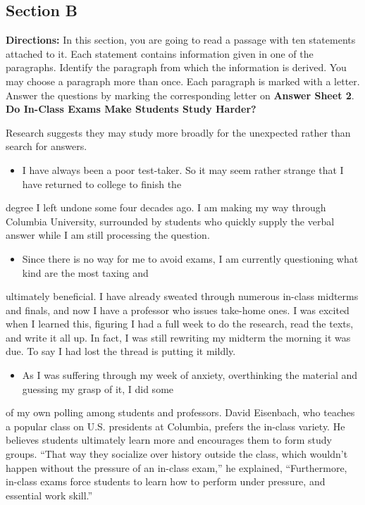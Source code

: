 \documentclass[UTF8,11pt]{ctexart}
\begin{document}
\subsection*{\textbf{Section B}}


\textbf{Directions:} In this section, you are going to read a passage with ten statements attached to it. Each statement contains information given in one of the paragraphs. Identify the paragraph from which the information is derived. You may choose a paragraph more than once. Each paragraph is marked with a letter. Answer the questions by marking the corresponding letter on\textbf{ Answer Sheet 2}. \textbf{Do In-Class Exams Make Students Study Harder?}


Research suggests they may study more broadly for the unexpected rather than search for answers.


\begin{itemize}[leftmargin=2em,itemsep=.2em,topsep=.4em]\item[A.] I have always been a poor test-taker. So it may seem rather strange that I have returned to college to finish the
\end{itemize}

degree I left undone some four decades ago. I am making my way through Columbia University, surrounded by students who quickly supply the verbal answer while I am still processing the question.


\begin{itemize}[leftmargin=2em,itemsep=.2em,topsep=.4em]\item[B.] Since there is no way for me to avoid exams, I am currently questioning what kind are the most taxing and
\end{itemize}

ultimately beneficial. I have already sweated through numerous in-class midterms and finals, and now I have a professor who issues take-home ones. I was excited when I learned this, figuring I had a full week to do the research, read the texts, and write it all up. In fact, I was still rewriting my midterm the morning it was due. To say I had lost the thread is putting it mildly.


\begin{itemize}[leftmargin=2em,itemsep=.2em,topsep=.4em]\item[C.] As I was suffering through my week of anxiety, overthinking the material and guessing my grasp of it, I did some
\end{itemize}

of my own polling among students and professors. David Eisenbach, who teaches a popular class on U.S. presidents at Columbia, prefers the in-class variety. He believes students ultimately learn more and encourages them to form study groups. “That way they socialize over history outside the class, which wouldn’t happen without the pressure of an in-class exam,” he explained, “Furthermore, in-class exams force students to learn how to perform under pressure, and essential work skill.”
\end{document}
